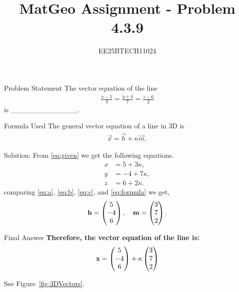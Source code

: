\documentclass{beamer}
\title{MatGeo Assignment - Problem 4.3.9}
\author{EE25BTECH11024}
\institute{IIT Hyderabad}
\begin{document}
\begin{frame}
  \titlepage
\end{frame}

\begin{frame}{Problem Statement}
The vector equation of the line
\begin{align}
\frac{x - 5}{3} = \frac{y + 4}{7} = \frac{z - 6}{2}
\label{eq:given}
\end{align}
is \_\_\_\_\_\_\_\_\_\_\_\_\_.
\end{frame}


\begin{frame}{Formula Used}
    The general vector equation of a line in 3D is
\begin{align}
\vec{x} = \vec{h} + \kappa \vec{m},   
\label{eq:formula}
\end{align}
    
\end{frame}

\begin{frame}{Solution: }
\noindent
From \eqref{eq:given} we get the following equations.
\begin{align}
    x &= 5 + 3\kappa, \label{eq:a} \\ 
    y &= -4 + 7\kappa, \label{eq:b} \\ 
    z &= 6 + 2\kappa. \label{eq:c}
\end{align}
comparing \eqref{eq:a}, \eqref{eq:b}, \eqref{eq:c}, and \eqref{eq:formula} we get,
\begin{align}
\mathbf{h} = \begin{pmatrix}5 \\ -4 \\ 6\end{pmatrix}, \quad 
\mathbf{m} = \begin{pmatrix}3 \\ 7 \\ 2\end{pmatrix}.    
\end{align}
\end{frame}


\begin{frame}{Final Answer}
\noindent
\textbf{Therefore, the vector equation of the line is:}
\begin{align}
\mathbf{x} = \begin{pmatrix}5 \\ -4 \\ 6\end{pmatrix} + \kappa \begin{pmatrix}3 \\ 7 \\ 2\end{pmatrix}
\end{align}

See Figure~\ref{fig:3DVectors}.   
\end{frame}
\end{document}
